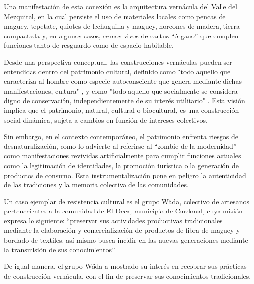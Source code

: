 Una manifestación de esta conexión es la arquitectura vernácula del Valle del Mezquital, en la cual persiste el uso de materiales locales como pencas de maguey, tepetate, quiotes de lechuguilla y maguey, horcones de madera, tierra compactada y, en algunos casos, cercos vivos de cactus ``órgano'' que cumplen funciones tanto de resguardo como de espacio habitable.

Desde una perspectiva conceptual, las construcciones vernáculas pueden ser entendidas dentro del patrimonio cultural, definido como "todo aquello que caracteriza al hombre como especie autoconsciente que genera mediante dichas manifestaciones, cultura" \citep{dominguez2004pautas}, y como "todo aquello que socialmente se considera digno de conservación, independientemente de su interés utilitario" \citep[p. 63]{prats1998concepto}. Esta visión implica que el patrimonio, natural, cultural o biocultural, es una construcción social dinámica, sujeta a cambios en función de intereses colectivos.

Sin embargo, en el contexto contemporáneo, el patrimonio enfrenta riesgos de desnaturalización, como lo advierte \cite{i2008zombi} al referirse al ``zombie de la modernidad'' como manifestaciones revividas artificialmente para cumplir funciones actuales como la legitimación de identidades, la promoción turística o la generación de productos de consumo. Esta instrumentalización pone en peligro la autenticidad de las tradiciones y la memoria colectiva de las comunidades.

Un caso ejemplar de resistencia cultural es el grupo Wäda, colectivo de artesanos pertenecientes a la comunidad de El Deca, municipio de Cardonal, cuya misión expresa lo siguiente: ``preservar sus actividades productivas tradicionales mediante la elaboración y comercialización de productos de fibra de maguey y bordado de textiles, así mismo busca incidir en las nuevas generaciones mediante la transmisión de sus conocimientos''

De igual manera, el grupo Wäda a mostrado su interés en recobrar sus prácticas de construcción vernácula, con el fin de preservar sus conocimientos tradicionales.
